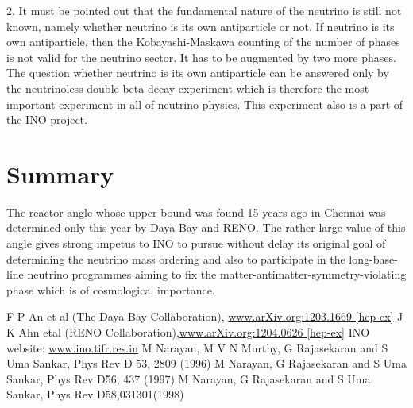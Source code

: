 2. It must be pointed out that the fundamental nature of the neutrino 
is still not known, namely whether neutrino is its own antiparticle 
or not. If neutrino is its own antiparticle, then the Kobayashi-Maskawa 
counting of the number of phases is not valid for the neutrino 
sector. It has to be augmented by two more phases. The question 
whether neutrino is its own antiparticle can be answered only by the 
neutrinoless double beta decay experiment which is therefore the most 
important experiment in all of neutrino physics. This experiment also 
is a part of the INO project.

\section*{Summary}

The reactor angle whose upper bound was found 15 years ago in 
Chennai was determined only this year by Daya Bay and RENO. The 
rather large value of this angle gives strong impetus to INO 
to pursue without delay its original goal of determining
the neutrino mass ordering and also to participate in
the long-base-line neutrino programmes aiming to fix the 
matter-antimatter-symmetry-violating phase which is of 
cosmological importance.

\begin{thebibliography}{99}
 F P An et al (The Daya Bay Collaboration), \url{www.arXiv.org:1203.1669
    [hep-ex]}
 J K Ahn etal (RENO Collaboration),\url{www.arXiv.org:1204.0626 [hep-ex]}
 INO website: \url{www.ino.tifr.res.in}
 M Narayan, M V N Murthy, G Rajasekaran and S Uma Sankar, Phys Rev D
    53, 2809 (1996)
 M Narayan, G Rajasekaran and S Uma Sankar, Phys Rev D56, 437 (1997)
 M Narayan, G Rajasekaran and S Uma Sankar, Phys Rev D58,031301(1998)
\end{thebibliography}
